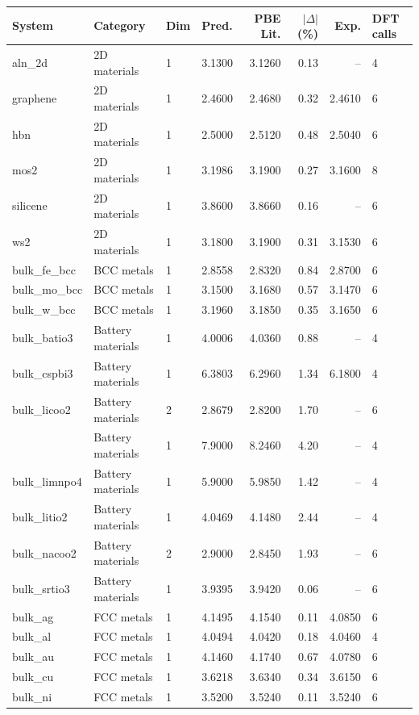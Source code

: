 \begin{tabular}{llllrrrl}
\toprule
System & Category & Dim & Pred. & PBE Lit. & $|\Delta|$ (\%) & Exp. & DFT calls \\
\midrule
aln\_2d & 2D materials & 1 & 3.1300 & 3.1260 & 0.13 & -- & 4 \\
graphene & 2D materials & 1 & 2.4600 & 2.4680 & 0.32 & 2.4610 & 6 \\
hbn & 2D materials & 1 & 2.5000 & 2.5120 & 0.48 & 2.5040 & 6 \\
mos2 & 2D materials & 1 & 3.1986 & 3.1900 & 0.27 & 3.1600 & 8 \\
silicene & 2D materials & 1 & 3.8600 & 3.8660 & 0.16 & -- & 6 \\
ws2 & 2D materials & 1 & 3.1800 & 3.1900 & 0.31 & 3.1530 & 6 \\
\midrule
bulk\_fe\_bcc & BCC metals & 1 & 2.8558 & 2.8320 & 0.84 & 2.8700 & 6 \\
bulk\_mo\_bcc & BCC metals & 1 & 3.1500 & 3.1680 & 0.57 & 3.1470 & 6 \\
bulk\_w\_bcc & BCC metals & 1 & 3.1960 & 3.1850 & 0.35 & 3.1650 & 6 \\
\midrule
bulk\_batio3 & Battery materials & 1 & 4.0006 & 4.0360 & 0.88 & -- & 4 \\
bulk\_cspbi3 & Battery materials & 1 & 6.3803 & 6.2960 & 1.34 & 6.1800 & 4 \\
bulk\_licoo2 & Battery materials & 2 & 2.8679 & 2.8200 & 1.70 & -- & 6 \\
\textbf{bulk\_limn2o4 & Battery materials & 1 & 7.9000 & 8.2460 & 4.20 & -- & 4 } \\
bulk\_limnpo4 & Battery materials & 1 & 5.9000 & 5.9850 & 1.42 & -- & 4 \\
bulk\_litio2 & Battery materials & 1 & 4.0469 & 4.1480 & 2.44 & -- & 4 \\
bulk\_nacoo2 & Battery materials & 2 & 2.9000 & 2.8450 & 1.93 & -- & 6 \\
bulk\_srtio3 & Battery materials & 1 & 3.9395 & 3.9420 & 0.06 & -- & 6 \\
\midrule
bulk\_ag & FCC metals & 1 & 4.1495 & 4.1540 & 0.11 & 4.0850 & 6 \\
bulk\_al & FCC metals & 1 & 4.0494 & 4.0420 & 0.18 & 4.0460 & 4 \\
bulk\_au & FCC metals & 1 & 4.1460 & 4.1740 & 0.67 & 4.0780 & 6 \\
bulk\_cu & FCC metals & 1 & 3.6218 & 3.6340 & 0.34 & 3.6150 & 6 \\
bulk\_ni & FCC metals & 1 & 3.5200 & 3.5240 & 0.11 & 3.5240 & 6 \\

\end{tabular}
